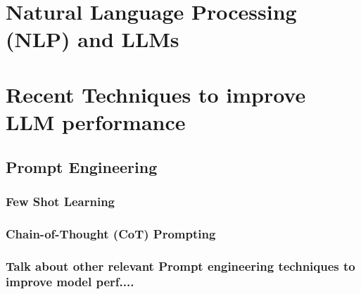 \documentclass[11pt,a4paper,twoside,openright]{book}
\begin{document}
\section{Natural Language Processing (NLP) and LLMs}



\section{Recent Techniques to improve LLM performance}

\subsection{Prompt Engineering}

\subsubsection{Few Shot Learning}
\subsubsection{Chain-of-Thought (CoT) Prompting}
\subsubsection{Talk about other relevant Prompt engineering techniques to improve model perf....}



\end{document}
